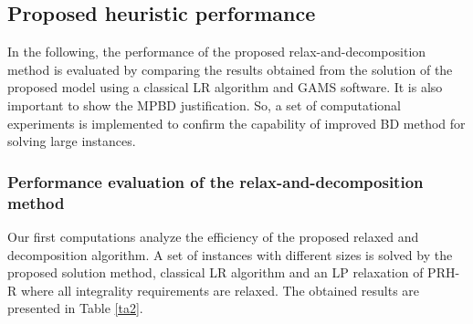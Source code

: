 \documentclass[review]{elsarticle}
\begin{document}
\subsection{Proposed heuristic performance}

In the following, the performance of the proposed relax-and-decomposition method is evaluated by comparing the results obtained from the solution of the proposed model using a classical LR algorithm and GAMS software. It is also important to show the MPBD justification. So, a set of computational experiments is implemented to confirm the capability of improved BD method for solving large instances.

\subsubsection{Performance evaluation of the relax-and-decomposition method}

Our first computations analyze the efficiency of the proposed relaxed and decomposition algorithm. A set of instances with different sizes is solved by the proposed solution method, classical LR algorithm and an LP relaxation of PRH-R where all integrality requirements are relaxed. The obtained results are presented in Table \ref{ta2}.
\end{document}
